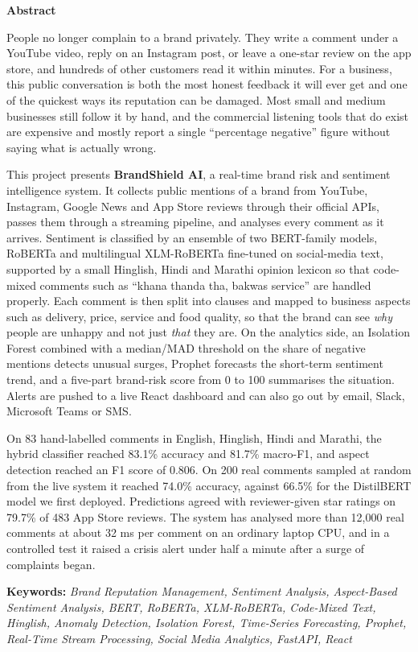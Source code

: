 \begin{center}
\bfseries \fontsize{24}{12} \selectfont Abstract
\end{center}
\vspace*{1\baselineskip}
{\setlength{\parindent}{0pt}\setlength{\parskip}{8pt}
People no longer complain to a brand privately. They write a comment under a YouTube video, reply on an Instagram post, or leave a one-star review on the app store, and hundreds of other customers read it within minutes. For a business, this public conversation is both the most honest feedback it will ever get and one of the quickest ways its reputation can be damaged. Most small and medium businesses still follow it by hand, and the commercial listening tools that do exist are expensive and mostly report a single ``percentage negative'' figure without saying what is actually wrong.

This project presents \textbf{BrandShield AI}, a real-time brand risk and sentiment intelligence system. It collects public mentions of a brand from YouTube, Instagram, Google News and App Store reviews through their official APIs, passes them through a streaming pipeline, and analyses every comment as it arrives. Sentiment is classified by an ensemble of two BERT-family models, RoBERTa and multilingual XLM-RoBERTa fine-tuned on social-media text, supported by a small Hinglish, Hindi and Marathi opinion lexicon so that code-mixed comments such as ``khana thanda tha, bakwas service'' are handled properly. Each comment is then split into clauses and mapped to business aspects such as delivery, price, service and food quality, so that the brand can see \textit{why} people are unhappy and not just \textit{that} they are. On the analytics side, an Isolation Forest combined with a median/MAD threshold on the share of negative mentions detects unusual surges, Prophet forecasts the short-term sentiment trend, and a five-part brand-risk score from 0 to 100 summarises the situation. Alerts are pushed to a live React dashboard and can also go out by email, Slack, Microsoft Teams or SMS.

On 83 hand-labelled comments in English, Hinglish, Hindi and Marathi, the hybrid classifier reached 83.1\% accuracy and 81.7\% macro-F1, and aspect detection reached an F1 score of 0.806. On 200 real comments sampled at random from the live system it reached 74.0\% accuracy, against 66.5\% for the DistilBERT model we first deployed. Predictions agreed with reviewer-given star ratings on 79.7\% of 483 App Store reviews. The system has analysed more than 12,000 real comments at about 32 ms per comment on an ordinary laptop CPU, and in a controlled test it raised a crisis alert under half a minute after a surge of complaints began.

}

\vspace*{0.6\baselineskip}
\noindent\textbf{Keywords:} \textit{Brand Reputation Management, Sentiment Analysis, Aspect-Based Sentiment Analysis, BERT, RoBERTa, XLM-RoBERTa, Code-Mixed Text, Hinglish, Anomaly Detection, Isolation Forest, Time-Series Forecasting, Prophet, Real-Time Stream Processing, Social Media Analytics, FastAPI, React}
